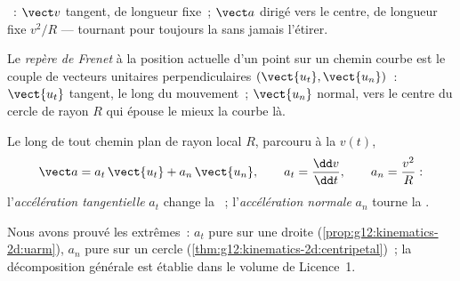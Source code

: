 \begin{omfigure}

{\small {}~: $\vect v$ tangent, de
longueur fixe~; $\vect a$ dirigé vers le centre, de longueur fixe
$v^2/R$ --- tournant pour toujours la  sans jamais l'étirer.}
\end{omfigure}

\begin{definition}\label{def:g12:kinematics-2d:frenet}
Le \emph{repère de Frenet} à la position
actuelle d'un point sur un chemin courbe est le couple de vecteurs
unitaires perpendiculaires $(\vect{u_t}, \vect{u_n})$~:
$\vect{u_t}$ tangent, le long du mouvement~; $\vect{u_n}$ normal, vers
le centre du cercle de rayon $R$ qui épouse le mieux la courbe là.
\end{definition}

\begin{proposition}\label{prop:g12:kinematics-2d:frenetacc}
Le long de tout chemin plan de rayon local $R$, parcouru à la
 $v(t)$,
\[
\vect a = a_t\,\vect{u_t} + a_n\,\vect{u_n},
\qquad a_t = \frac{\dd v}{\dd t},
\qquad a_n = \frac{v^2}{R}:
\]
l'\emph{accélération tangentielle}
$a_t$ change la ~; l'\emph{accélération
normale} $a_n$ tourne la .
\end{proposition}
\admitted

\begin{remark}\label{rem:g12:kinematics-2d:frenetproof}
Nous avons prouvé les extrêmes~: $a_t$ pure sur une droite
(\cref{prop:g12:kinematics-2d:uarm}), $a_n$ pure sur un cercle
(\cref{thm:g12:kinematics-2d:centripetal})~; la décomposition générale
est établie dans le volume de Licence~1.
\end{remark}

